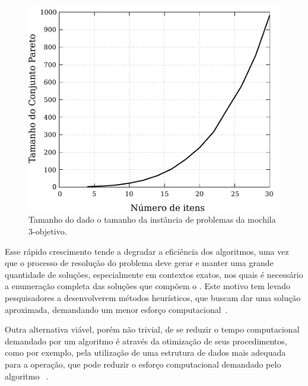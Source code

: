 \begin{figure}[ht]
  \centering
  \includegraphics[scale=0.5]{img/mokp/par-grow-d3}
  \caption{Tamanho do \paretoset{} dado o tamanho da instância de problemas da mochila 3-objetivo.}
  \label{fig:pargrow3}
\end{figure}

Esse rápido crescimento tende a degradar a eficiência dos algoritmos,
uma vez que o processo de resolução do problema
deve gerar e manter uma grande quantidade de soluções,
especialmente em contextos exatos, nos quais é necessário a enumeração completa das soluções que compõem o \paretoset{}.
Este motivo tem levado pesquisadores a desenvolverem métodos heurísticos,
que buscam dar uma solução aproximada, demandando um menor esforço computacional~\cite{deb2002fast,zitzler1998multiobjective,zhang2007moea}.


Outra alternativa viável, porém não trivial, de se reduzir o tempo computacional
demandado por um algoritmo é através da otimização de seus procedimentos,
como por exemplo, pela utilização de uma estrutura de dados mais adequada
para a operação, que pode reduzir o esforço computacional demandado pelo algoritmo
~\cite{cormen2009introduction, aho1974design,knuth1973fundamental}.

